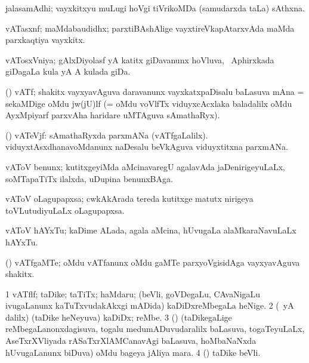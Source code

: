 \bentry
{} 
\gl{\nA}
\expl{}
\bmng
jalasamAdhi; vayxkitxyu muLugi hoVgi tiVrikoMDa (samudarxda taLa) sAthxna. 
\emng
\eentry

\bentry
{} 
\gl{\nA}
\expl{}
\bmng
vATasxnf; maMdabaudidhx; parxtiBAshAlige vayxtireVkapAtarxvAda maMda parxkaqtiya vayxkitx. 
\emng
\eentry

\bentry
{} 
\gl{\nA}
\expl{}
\bmng
vATosxVniya; gAlxDiyolasf yA katitx giDavanunx hoVluva, \da\ Aphirxkada giDagaLa kula yA A kulada giDa. 
\emng
\eentry

\bentry
{} 
\gl{\nA}
\expl{}
\bmng
(\Bwvi) vATf; shakitx vayxyavAguva daravanunx vayxkatxpaDisalu baLasuva mAna = sekaMDige oMdu jw(jU)lf (= oMdu voVlfTx viduyxcAcxlaka baladalilx oMdu AyxMpiyarf parxvAha haridare uMTAguva sAmathaRyx). 
\emng
\eentry

\bentry
{} 
\gl{\nA}
\expl{}
\bmng
(\Bwvi) vATeVjf: 
\banum
{} sAmathaRyxda parxmANa (vATfgaLalilx). 
 viduyxtAsxdhanavoMdanunx naDesalu beVkAguva viduyxtitxna parxmANa. 
\eanum
\emng
\eentry

\bentry
{} 
\gl{\nA}
\expl{}
\bmng
vAToV benunx; kutitxgeyiMda aMcinavaregU agalavAda jaDenirigeyuLaLx, soMTapaTiTx ilalxda, uDupina benunxBAga. 
\emng
\eentry

\bentry
{} 
\gl{\nA}
\expl{}
\bmng
vAToV oLagupapxsa; cwkAkArada tereda kutitxge matutx nirigeya toVLutudiyuLaLx oLagupapxsa. 
\emng
\eentry

\bentry
{} 
\gl{\nA}
\expl{}
\bmng
vAToV hAYxTu; kaDime ALada, agala aMcina, hUvugaLa alaMkaraNavuLaLx hAYxTu. 
\emng
\eentry

\bentry
{} 
\gl{\nA}
\expl{}
\bmng
(\viduyx) vATfgaMTe; oMdu vATfanunx oMdu gaMTe parxyoVgisidAga vayxyavAguva shakitx. 
\emng
\eentry

\bentry
{} 
\gl{\nA}
\expl{}
\bmng
\bnum
\num{1} vATflf; taDike; taTiTx; haMdaru; (beVli, goVDegaLu, CAvaNigaLu ivugaLanunx kaTuTxvudakAkxgi mADida) kaDiDxreMbegaLa heNige. 
\num{2} (\Eva\ yA \bava dalilx) (taDike heNeyuva) kaDiDx; reMbe. 
\num{3} (\AseTxrXV) (taDikegaLige reMbegaLanonxdagisuva, togalu medumADuvudaralilx baLasuva, togaTeyuLaLx, AseTxrXVliyada rASaTxrXlAMCanavAgi baLasuva, hoMbaNaNxda hUvugaLanunx biDuva) oMdu bageya jAliya mara. 
\num{4} (\pArxM) taDike beVli. 
\enum
\emng


